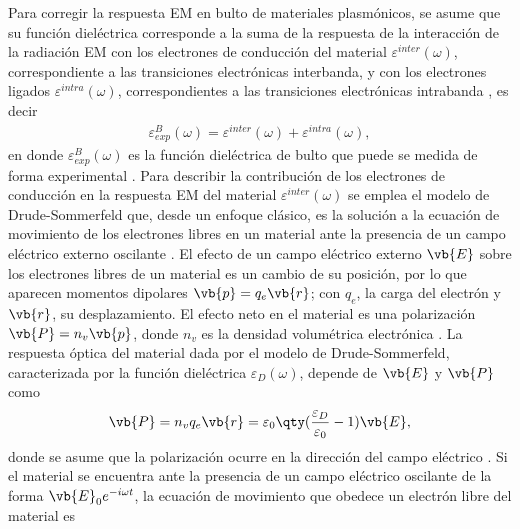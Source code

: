 Para corregir la respuesta EM  en bulto de materiales plasmónicos, se asume que su función dieléctrica corresponde a la suma de la respuesta de la interacción de la radiación EM con los electrones de conducción del material  $\varepsilon^{inter}(\omega) $, correspondiente a las transiciones electrónicas interbanda, y con los electrones ligados  $\varepsilon^{intra}(\omega) $, correspondientes a las transiciones electrónicas intrabanda \cite{noguez2007surface}, es decir
	\begin{align*}
	\varepsilon^B_{exp}(\omega) = \varepsilon^{inter}(\omega) + \varepsilon^{intra}(\omega),
	\end{align*}
en donde $\varepsilon^B_{exp}(\omega)$ es la función dieléctrica de bulto que puede se medida de forma experimental \cite{johnson1972constants}. Para describir la contribución de los electrones de conducción en la respuesta EM del material $\varepsilon^{inter}(\omega)$ se emplea el modelo de Drude-Sommerfeld que, desde un enfoque clásico, es la solución a la ecuación de movimiento de los electrones libres en un material ante la presencia de un campo eléctrico externo oscilante \cite{gross2014festkorperphysik}. El efecto de un campo eléctrico externo $\vb{E}$ sobre los electrones libres de un material es un cambio de su posición, por lo que aparecen momentos dipolares $\vb{p}=q_e\vb{r}$; con $q_e$, la carga del electrón y $\vb{r}$, su desplazamiento.  El efecto neto en el material es una polarización $\vb{P} = n_v \vb{p}$, donde $n_v$ es la densidad volumétrica electrónica \cite{novotny2006principles}.  La respuesta óptica del material dada por el modelo de Drude-Sommerfeld, caracterizada por la función dieléctrica $\varepsilon_D(\omega)$, depende de $\vb{E}$ y $\vb{P}$ como 
	\begin{align}
	\vb{P} = n_v q_e \vb{r} =\varepsilon_0\qty(\frac{\varepsilon_D}{\varepsilon_0}-1)\vb{E},
	\label{eq:PolarizationDrude}
	\end{align}
donde se asume que la polarización ocurre en la dirección del campo eléctrico \cite{novotny2006principles}. Si el material se encuentra ante la presencia de un campo eléctrico oscilante de la forma $\vb{E}_0 e^{-i\omega t}$, la ecuación de movimiento que obedece un electrón libre del material es \cite{kreibig1995clusters,gross2014festkorperphysik}
